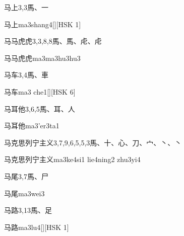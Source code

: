 \begin{Entry}{马上}{3,3}{⾺、⼀}
  \begin{Phonetics}{马上}{ma3shang4}[][HSK 1]
  \end{Phonetics}
\end{Entry}

\begin{Entry}{马马虎虎}{3,3,8,8}{⾺、⾺、⾌、⾌}
  \begin{Phonetics}{马马虎虎}{ma3ma3hu3hu3}
  \end{Phonetics}
\end{Entry}

\begin{Entry}{马车}{3,4}{⾺、⾞}
  \begin{Phonetics}{马车}{ma3 che1}[][HSK 6]
  \end{Phonetics}
\end{Entry}

\begin{Entry}{马耳他}{3,6,5}{⾺、⽿、⼈}
  \begin{Phonetics}{马耳他}{ma3'er3ta1}
  \end{Phonetics}
\end{Entry}

\begin{Entry}{马克思列宁主义}{3,7,9,6,5,5,3}{⾺、⼗、⼼、⼑、⼧、⼂、⼂}
  \begin{Phonetics}{马克思列宁主义}{ma3ke4si1 lie4ning2 zhu3yi4}
  \end{Phonetics}
\end{Entry}

\begin{Entry}{马尾}{3,7}{⾺、⼫}
  \begin{Phonetics}{马尾}{ma3wei3}
  \end{Phonetics}
\end{Entry}

\begin{Entry}{马路}{3,13}{⾺、⾜}
  \begin{Phonetics}{马路}{ma3lu4}[][HSK 1]
  \end{Phonetics}
\end{Entry}


